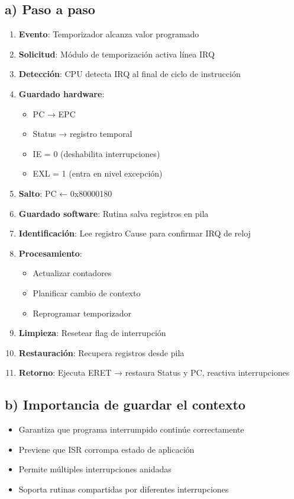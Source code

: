 \documentclass[12pt]{article}
\begin{document}
\subsection*{a) Paso a paso}
\begin{enumerate}
    \item \textbf{Evento}: Temporizador alcanza valor programado
    \item \textbf{Solicitud}: Módulo de temporización activa línea IRQ
    \item \textbf{Detección}: CPU detecta IRQ al final de ciclo de instrucción
    \item \textbf{Guardado hardware}: 
    \begin{itemize}
        \item PC → EPC
        \item Status → registro temporal
        \item IE = 0 (deshabilita interrupciones)
        \item EXL = 1 (entra en nivel excepción)
    \end{itemize}
    \item \textbf{Salto}: PC ← 0x80000180
    \item \textbf{Guardado software}: Rutina salva registros en pila
    \item \textbf{Identificación}: Lee registro Cause para confirmar IRQ de reloj
    \item \textbf{Procesamiento}: 
    \begin{itemize}
        \item Actualizar contadores
        \item Planificar cambio de contexto
        \item Reprogramar temporizador
    \end{itemize}
    \item \textbf{Limpieza}: Resetear flag de interrupción
    \item \textbf{Restauración}: Recupera registros desde pila
    \item \textbf{Retorno}: Ejecuta ERET → restaura Status y PC, reactiva interrupciones
\end{enumerate}

\subsection*{b) Importancia de guardar el contexto}
\begin{itemize}
    \item Garantiza que programa interrumpido continúe correctamente
    \item Previene que ISR corrompa estado de aplicación
    \item Permite múltiples interrupciones anidadas
    \item Soporta rutinas compartidas por diferentes interrupciones
\end{itemize}
\end{document}

